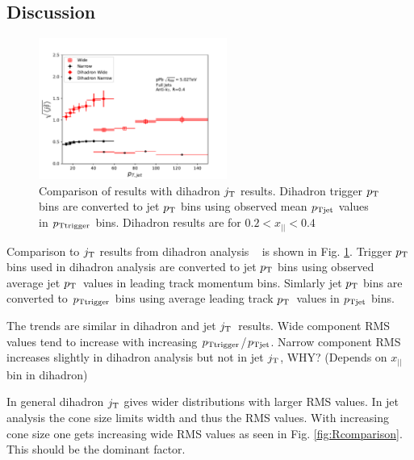 \subsection{Discussion}
\begin{figure}[htb]
\centering
\includegraphics[width=0.55\textwidth]{figures/results/RMSWithSystematics_DihadronJetPt}
\caption{Comparison of results with dihadron $j_{\rm T}$ results. Dihadron trigger $p_{\rm T}$ bins are converted to jet $p_{\rm T}$  bins  using observed mean  $p_{\rm Tjet}$ values in $p_{\rm Ttrigger}$ bins. Dihadron results are for $0.2 < x_{||} < 0.4$ }
\label{fig:DihadronComparison}
\end{figure}

Comparison to $j_{\rm T}$ results from dihadron analysis ~\cite{ALICEjt} is shown in Fig. \ref{fig:DihadronComparison}. Trigger $p_{\rm T}$ bins used in dihadron analysis are converted to jet $p_{\rm T}$ bins using observed average jet $p_{\rm T}$ values in leading track momentum bins. Simlarly jet $p_{\rm T}$ bins are converted to $p_{\rm Ttrigger}$ bins using average leading track $p_{\rm T}$ values in $p_{\rm Tjet}$ bins.

The trends are similar in dihadron and jet $j_{\rm T}$ results. Wide component RMS values tend to increase with increasing $p_{\rm Ttrigger}$/$p_{\rm Tjet}$. Narrow component RMS increases slightly in dihadron analysis but not in jet $j_{\rm T}$, WHY? (Depends on $x_{||}$ bin in dihadron)

In general dihadron $j_{\rm T}$ gives wider distributions with larger RMS values. In jet analysis the cone size limits width and thus the RMS values. With increasing cone size one gets increasing wide RMS values as seen in Fig. \ref{fig:Rcomparison}. This should be the dominant factor.

